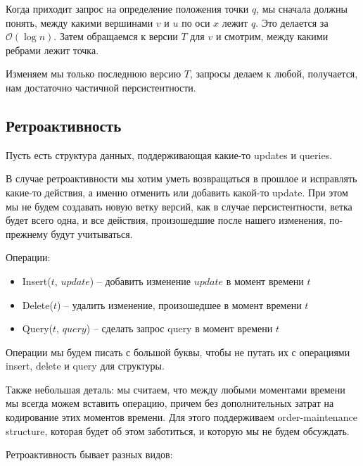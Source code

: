 Когда приходит запрос на определение положения точки $q$, мы сначала должны понять, между какими вершинами $v$ и $u$ по оси $x$ лежит $q$. 
Это делается за $\mathcal{O}(\log n)$.
Затем обращаемся к версии $T$ для $v$ и смотрим, между какими ребрами лежит точка.

Изменяем мы только последнюю версию $T$, запросы делаем к любой, получается, нам достаточно частичной персистентности.

\subsection{Ретроактивность}

Пусть есть структура данных, поддерживающая какие-то updates и queries.

В случае ретроактивности мы хотим уметь возвращаться в прошлое и исправлять какие-то действия, а именно отменить или добавить какой-то update.
При этом мы не будем создавать новую ветку версий, как в случае персистентности, ветка будет всего одна, и все действия, произошедшие после нашего изменения, по-прежнему будут учитываться.

Операции:

\begin{itemize}

\item Insert($t$, $update$) -- добавить изменение $update$ в момент времени $t$
\item Delete($t$) -- удалить изменение, произошедшее в момент времени $t$
\item Query($t$, $query$) -- сделать запрос query в момент времени $t$

\end{itemize}

Операции мы будем писать с большой буквы, чтобы не путать их с операциями insert, delete и query для структуры.

Также небольшая деталь: мы считаем, что между любыми моментами времени мы всегда можем вставить операцию, причем без дополнительных затрат на кодирование этих моментов времени.
Для этого поддерживаем order-maintenance structure, которая будет об этом заботиться, и которую мы не будем обсуждать.

Ретроактивность бывает разных видов:

